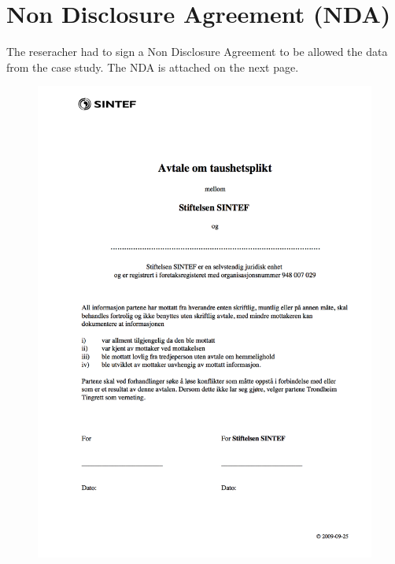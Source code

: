 \chapter{Non Disclosure Agreement (NDA)}
The reseracher had to sign a Non Disclosure Agreement to be allowed the data from the case study. The NDA is attached on the next page.

\begin{figure}
\begin{center}
\includegraphics[trim = 0mm 40mm 0mm 0mm, clip, width=\textwidth]{images/taushetsplikt.png}
\end{center}
\end{figure}